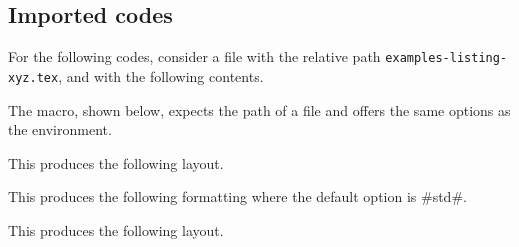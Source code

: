 \documentclass{tutodoc}
\begin{document}
\subsection{Imported codes}

For the following codes, consider a file with the relative path \verb+examples-listing-xyz.tex+, and with the following contents.


\medskip

The  macro, shown below, expects the path of a file and offers the same options as the  environment.




\begin{tdocexa}
    \leavevmode

    \begin{tdoclatex}[code]
    \end{tdoclatex}

    This produces the following layout.

\end{tdocexa}




\begin{tdocexa}[Following]
    \leavevmode

    \begin{tdoclatex}[code]
    \end{tdoclatex}

    This produces the following formatting where the default option is \tdoclatexin#std#.

\end{tdocexa}




\begin{tdocexa}
    \leavevmode

    \begin{tdoclatex}[code]
    \end{tdoclatex}

    This produces the following layout.

\end{tdocexa}
\end{document}
